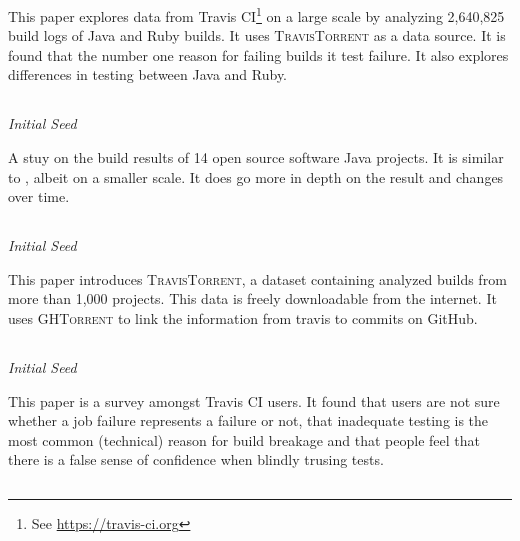 \documentclass[]{book}
\let\rmarkdownfootnote\footnote%
\def\footnote{\protect\rmarkdownfootnote}
\begin{document}
This paper explores data from Travis CI\footnote{See
  \url{https://travis-ci.org}} on a large scale by analyzing 2,640,825
build logs of Java and Ruby builds. It uses \textsc{TravisTorrent} as a
data source. It is found that the number one reason for failing builds
it test failure. It also explores differences in testing between Java
and Ruby.

\subsection{\texorpdfstring{\citet{rausch2017empirical}}{@rausch2017empirical}}\label{rausch2017empirical}

\emph{Initial Seed}

A stuy on the build results of 14 open source software Java projects. It
is similar to \citet{beller2017oops}, albeit on a smaller scale. It does
go more in depth on the result and changes over time.

\subsection{\texorpdfstring{\citet{beller2017travistorrent}}{@beller2017travistorrent}}\label{beller2017travistorrent}

\emph{Initial Seed}

This paper introduces \textsc{TravisTorrent}, a dataset containing
analyzed builds from more than 1,000 projects. This data is freely
downloadable from the internet. It uses \textsc{GHTorrent} to link the
information from travis to commits on GitHub.

\subsection{\texorpdfstring{\citet{pinto2018work}}{@pinto2018work}}\label{pinto2018work}

\emph{Initial Seed}

This paper is a survey amongst Travis CI users. It found that users are
not sure whether a job failure represents a failure or not, that
inadequate testing is the most common (technical) reason for build
breakage and that people feel that there is a false sense of confidence
when blindly trusing tests.

\subsection{\texorpdfstring{\citet{zhao2017impact}}{@zhao2017impact}}\label{zhao2017impact}
\end{document}
